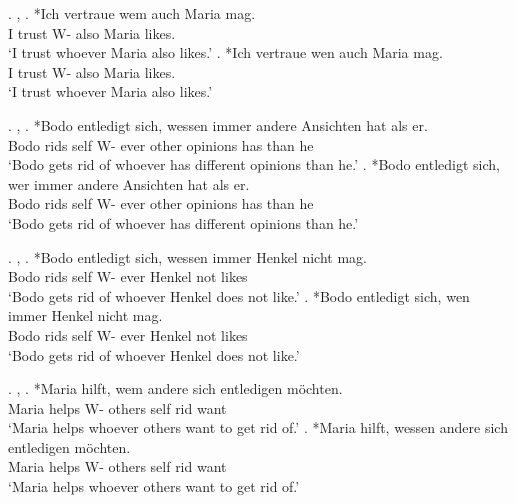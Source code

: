 \ex. , 
\ag. *Ich vertraue wem auch Maria mag. \\
 I trust\scsub{[dat]} W- also Maria likes.\\
 `I trust whoever Maria also likes.' \hfill \citep[345]{vogel2001}
\bg. *Ich vertraue wen auch Maria mag. \\
 I trust\scsub{[dat]} W- also Maria likes.\\
 `I trust whoever Maria also likes.' \hfill \citep[345]{vogel2001}

\ex. , 
\ag. *Bodo entledigt sich, wessen immer andere Ansichten hat als er.\\
 Bodo rids\scsub{[gen]} self  W- ever other opinions has\scsub{[nom]} than he\\
 `Bodo gets rid of whoever has different opinions than he.' \hfill \citep[345]{vogel2001}
\bg. *Bodo entledigt sich, wer immer andere Ansichten hat als er.\\
 Bodo rids\scsub{[gen]} self W- ever other opinions has\scsub{[nom]} than he\\
 `Bodo gets rid of whoever has different opinions than he.' \hfill \citep[345]{vogel2001}

\ex. , 
\ag. *Bodo entledigt sich, wessen immer Henkel nicht mag.\\
 Bodo rids\scsub{[gen]} self  W- ever Henkel not likes\\
 `Bodo gets rid of whoever Henkel does not like.' \hfill \citep[344]{vogel2001}
\bg. *Bodo entledigt sich, wen immer Henkel nicht mag.\\
 Bodo rids\scsub{[gen]} self W- ever Henkel not likes\\
 `Bodo gets rid of whoever Henkel does not like.' \hfill \citep[344]{vogel2001}

\ex. , 
\ag. *Maria hilft, wem andere sich entledigen möchten.\\
 Maria helps\scsub{[dat]} W- others self rid\scsub{[gen]} want\\
 `Maria helps whoever others want to get rid of.' \hfill \citep[344]{vogel2001}
\bg. *Maria hilft, wessen andere sich entledigen möchten.\\
 Maria helps\scsub{[dat]} W- others self rid\scsub{[gen]} want\\
 `Maria helps whoever others want to get rid of.' \hfill \citep[344]{vogel2001}

